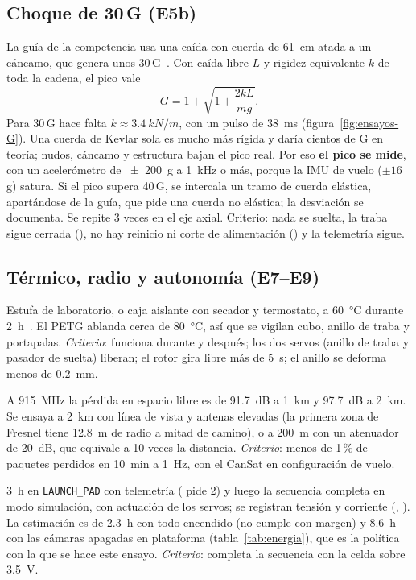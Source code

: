 \subsection{Choque de 30\,G (E5b)}
La guía de la competencia usa una caída con cuerda de \SI{61}{cm} atada a un cáncamo, que
genera unos 30\,G~\cite{ensayos-cansatenv}. Con caída libre $L$ y rigidez equivalente $k$
de toda la cadena, el pico vale
\begin{equation}
  G = 1+\sqrt{1+\frac{2kL}{mg}}.
  \label{eq:ensayos-G}
\end{equation}
Para 30\,G hace falta $k\approx\SI{3.4}{kN/m}$, con un pulso de \SI{38}{ms}
(figura~\ref{fig:ensayos-G}). Una cuerda de Kevlar sola es mucho más rígida y daría cientos de G en
teoría; nudos, cáncamo y estructura bajan el pico real. Por eso \textbf{el pico
se mide}, con un acelerómetro de \SI{\pm200}{g} a \SI{1}{kHz} o más, porque la IMU de
vuelo ($\pm16$\,g) satura. Si el pico supera 40\,G, se intercala un tramo de cuerda
elástica, apartándose de la guía, que pide una cuerda no elástica; la desviación se
documenta. Se repite 3 veces en el eje axial. Criterio: nada se suelta, la traba sigue
cerrada (), no hay reinicio ni corte de alimentación () y la telemetría
sigue.

\subsection{Térmico, radio y autonomía (E7--E9)}
\begin{description}[leftmargin=0pt, itemsep=3pt]
  \item[E7 Térmico.] Estufa de laboratorio, o caja aislante con secador y termostato, a
        \SI{60}{\celsius} durante \SI{2}{h}~\cite{ensayos-cansatenv}. El PETG ablanda cerca de
        \SI{80}{\celsius}, así que se vigilan cubo, anillo de traba y portapalas.
        \emph{Criterio}: funciona durante y después; los dos servos (anillo de traba y pasador de suelta) liberan; el rotor gira libre más
        de \SI{5}{s}; el anillo se deforma menos de \SI{0.2}{mm}.
  \item[E8 Alcance de radio.] A \SI{915}{MHz} la pérdida en espacio libre es de
        \SI{91.7}{dB} a \SI{1}{km} y \SI{97.7}{dB} a \SI{2}{km}. Se ensaya a \SI{2}{km} con
        línea de vista y antenas elevadas (la primera zona de Fresnel tiene \SI{12.8}{m} de
        radio a mitad de camino), o a \SI{200}{m} con un atenuador de \SI{20}{dB}, que
        equivale a 10 veces la distancia. \emph{Criterio}: menos de 1\,\% de paquetes
        perdidos en \SI{10}{min} a \SI{1}{Hz}, con el CanSat en configuración de vuelo.
  \item[E9 Autonomía en plataforma.] \SI{3}{h} en \texttt{LAUNCH\_PAD} con telemetría
        ( pide 2) y luego la secuencia completa en modo simulación, con actuación de los
        servos; se registran tensión y corriente (, ). La estimación es de
        \SI{2.3}{h} con todo encendido (no cumple con margen) y \SI{8.6}{h} con las cámaras apagadas en plataforma
        (tabla~\ref{tab:energia}), que es la política con la que se hace este ensayo. \emph{Criterio}: completa la secuencia con la celda
        sobre \SI{3.5}{V}.
\end{description}

